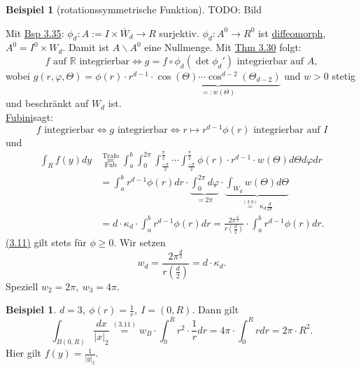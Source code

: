 \documentclass[a4paper]{scrreprt}
\newcommand{\R}{\mathbb{R}}
\newcommand{\jlabel}[1]{\label{j_#1}}
\newcommand{\jshortlink}[1]{\jhyperref{#1}{\text{#1}}}
\newcommand{\jhyperref}[2]{\hyperref[j_#1]{#2}}
\newcommand{\jlink}[1]{\jhyperref{#1}{#1}}
\newcommand{\jabb}[3]{ #1: #2 \rightarrow #3 }
\newcommand{\jlinkFubini}{\jhyperref{Fubini}{Fubini}}
\newcommand{\jshortlinkFubini}{\jhyperref{Fubini}{\text{Fub}}}
\newcommand{\jspace}{\vspace{8pt}}
\theoremstyle{plain}
\theoremstyle{definition}
\newtheorem{expl}[thm]{Beispiel}
\newtheorem*{expl*}{Beispiel}
\begin{document}
{{{{\begin{expl}[rotationssymmetrische Funktion]
    \jspace
    
    TODO: Bild
    
    \jspace
    
    Mit \jlink{Bsp 3.35}: $\jabb{\phi_d}{A:= I\times \overline{W}_d}{R}$ surjektiv. $\jabb{\phi_d}{A^0}{R^0}$ ist \jlink{diffeomorph}, $A^0 = I^0\times W_d$. Damit ist $A\backslash A^0$ eine Nullmenge. Mit \jlink{Thm 3.30} folgt:
    \[
        f\text{ auf }\R\text{ integrierbar} \Leftrightarrow g = f \circ \phi_d(\det \phi_d')\text{ integrierbar auf } A,
    \]
    wobei $g(r,\varphi, \Theta) = \phi(r)\cdot r^{d-1}\cdot \underbrace{\cos(\Theta)\cdots \cos^{d-2}(\Theta_{d-2})}_{=: w(\Theta)}$ und $w>0$ stetig und beschränkt auf $W_d$ ist.\\
    \jlinkFubini sagt:
    \[
        f \text{ integrierbar} \Leftrightarrow g \text{ integrierbar} \Leftrightarrow r\mapsto r^{d-1}\phi(r) \text{ integrierbar auf } I
    \]
    und
    \begin{equation}
        \jlabel{(3.11)}
        \begin{split}
            \int_R f(y)dy &\overset{\jshortlink{Trafo}}{\underset{\jshortlinkFubini}{=}} \int_a^b \int_0^{2\pi} \int_\frac{-\pi}{2}^\frac{\pi}{2}\cdots\int_\frac{-\pi}{2}^\frac{\pi}{2} \phi(r)\cdot r^{d-1}\cdot w(\Theta)d\Theta d\varphi dr\\
                          &=\int_a^b r^{d-1}\phi(r)dr \cdot \underbrace{\int_0^{2\pi}d\varphi}_{=2\pi} \cdot \underbrace{\int_{W_d} w(\Theta) d\Theta}_{\overset{\jlink{(3.9)}}{=} \kappa_d \frac{d}{2\pi}}\\
                          &=d\cdot \kappa_d \cdot \int_a^b r^{d-1}\phi(r) dr = \frac{2\pi^{\frac{d}{2}}}{r(\frac{d}{2})}\cdot \int_a^br^{d-1}\phi(r)dr.
        \end{split}
    \end{equation}
    \jlink{(3.11)} gilt stets für $\phi \ge 0$. Wir setzen
    \begin{equation}
        \jlabel{(3.12)}
        w_d = \frac{2\pi^\frac{d}{2}}{r(\frac{d}{2})} = d\cdot \kappa_d.
    \end{equation}
    Speziell $w_2 = 2\pi,\ w_3 = 4\pi$.
    
    \begin{expl*}
        $d=3, \ \phi(r) = \frac{1}{r}, \ I=(0,R)$. Dann gilt
        \[
            \int_{B(0,R)} \frac{dx}{|x|_2} \overset{(3.11)}{=} w_B\cdot \int_0^R r^2\cdot \frac{1}{r}dr = 4\pi\cdot \int_0^R r dr = 2\pi\cdot R^2.
        \]
        Hier gilt $f(y) = \frac{1}{|y|_2}$.
    \end{expl*}
\end{expl}

}}}}
\end{document}
